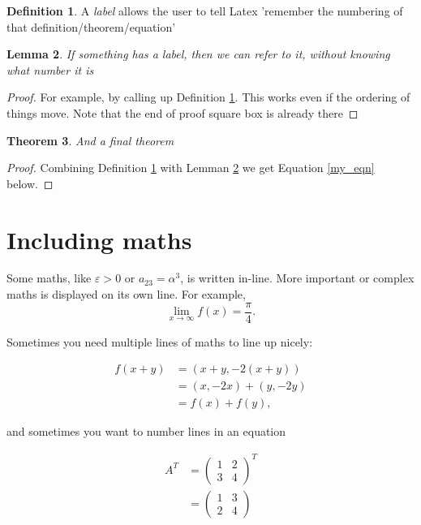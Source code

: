 \documentclass[a4paper,11pt]{article}
\newtheorem{theorem}{Theorem}[section]
\newtheorem{lemma}[theorem]{Lemma}
\theoremstyle{definition}
\newtheorem{definition}[theorem]{Definition}
\begin{document}
\begin{definition}\label{my_def}
	A \emph{label} allows the user to tell Latex 'remember the numbering of that definition/theorem/equation'
\end{definition}

\begin{lemma} \label{my_lem}
	If something has a label, then we can refer to it, without knowing what number it is 
\end{lemma}

\begin{proof}
	For example, by calling up Definition \ref{my_def}. This works even if the ordering of things move.
	Note that the end of proof square box is already there
\end{proof}

\begin{theorem}
	And a final theorem
\end{theorem}

\begin{proof}
	Combining Definition \ref{my_def} with Lemman \ref{my_lem} we get Equation \ref{my_eqn} below.
\end{proof}

\section{Including maths}

Some maths, like $\varepsilon>0$ or $a_{23}=\alpha^3$, is written in-line. More important or complex maths is displayed on its own line.
For example, $$ \lim_{x\to\infty}f(x)=\frac{\pi}{4}.$$

Sometimes you need multiple lines of maths to line up nicely:

\begin{align*}
f(x+y)&=(x+y,-2(x+y))\\
&=(x,-2x)+(y,-2y)\\
&=f(x)+f(y),
\end{align*}

and sometimes you want to number lines in an equation

\begin{align}
A^{T} & =\begin{pmatrix}1 & 2\\
3 & 4
\end{pmatrix}^{T}\\
\label{my_eqn}  & =\begin{pmatrix}1 & 3\\
2 & 4
\end{pmatrix}
\end{align}
\end{document}
